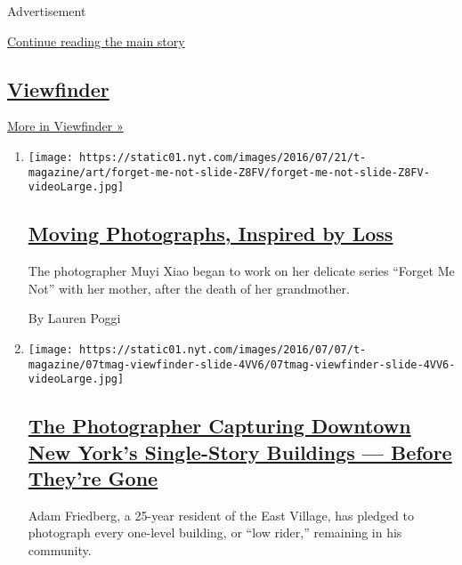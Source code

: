 Advertisement

\protect\hyperlink{after-mid1}{Continue reading the main story}

\hypertarget{viewfinder}{%
\subsection{\texorpdfstring{\href{/column/viewfinder}{Viewfinder}}{Viewfinder}}\label{viewfinder}}

\href{/column/viewfinder}{More in Viewfinder »}

\begin{enumerate}
\def\labelenumi{\arabic{enumi}.}
\item
  \texttt{[image: https://static01.nyt.com/images/2016/07/21/t-magazine/art/forget-me-not-slide-Z8FV/forget-me-not-slide-Z8FV-videoLarge.jpg]}

  \hypertarget{moving-photographs-inspired-by-loss}{%
  \subsection{\texorpdfstring{\href{/slideshow/2016/07/21/t-magazine/art/muyi-xiao-photographer-alzheimers.html}{Moving
  Photographs, Inspired by
  Loss}}{Moving Photographs, Inspired by Loss}}\label{moving-photographs-inspired-by-loss}}

  The photographer Muyi Xiao began to work on her delicate series
  ``Forget Me Not'' with her mother, after the death of her grandmother.

  By Lauren Poggi
\item
  \texttt{[image: https://static01.nyt.com/images/2016/07/07/t-magazine/07tmag-viewfinder-slide-4VV6/07tmag-viewfinder-slide-4VV6-videoLarge.jpg]}

  \hypertarget{the-photographer-capturing-downtown-new-yorks-single-story-buildings--before-theyre-gone}{%
  \subsection{\texorpdfstring{\href{/slideshow/2016/07/07/t-magazine/adam-friedberg-east-village-nyc-buildings.html}{The
  Photographer Capturing Downtown New York's Single-Story Buildings ---
  Before They're
  Gone}}{The Photographer Capturing Downtown New York's Single-Story Buildings --- Before They're Gone}}\label{the-photographer-capturing-downtown-new-yorks-single-story-buildings--before-theyre-gone}}

  Adam Friedberg, a 25-year resident of the East Village, has pledged to
  photograph every one-level building, or ``low rider,'' remaining in
  his community.


\end{enumerate}
